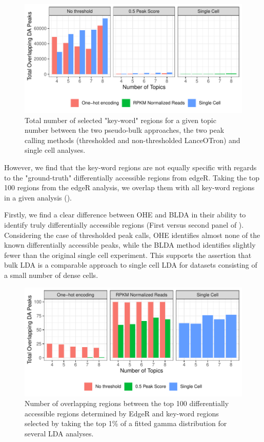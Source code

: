 \begin{figure}
  \centering
  \includegraphics[]{plot/ch4/pb_diff_acc_tot.pdf}
  \caption{Total number of selected "key-word" regions for a given topic number between the two pseudo-bulk approaches, the two peak calling methods (thresholded and non-thresholded LanceOTron) and single cell analyses.}

  \label{fig:pb_tot_number}
\end{figure}

However, we find that the key-word regions are not equally specific with regards to the "ground-truth" differentially accessible regions from edgeR. Taking the top 100 regions from the edgeR analysis, we overlap them with all key-word regions in a given analysis (). 

Firstly, we find a clear difference between OHE and BLDA in their ability to identify truly differentially accessible regions (First versus second panel of ). Considering the case of thresholded peak calls, OHE identifies almost none of the known differentially accessible peaks, while the BLDA method identifies slightly fewer than the original single cell experiment. This supports the assertion that bulk LDA is a comparable approach to single cell LDA for datasets consisting of a small number of dense cells. 

\begin{figure}
  \centering
  \includegraphics[]{plot/ch4/pb_diff_acc_olap.pdf}
  \caption{Number of overlapping regions between the top 100 differentially accessible regions determined by EdgeR and key-word regions selected by taking the top 1\% of a fitted gamma distribution for several LDA analyses. }
  \label{fig:pb_olap_number}
\end{figure}

